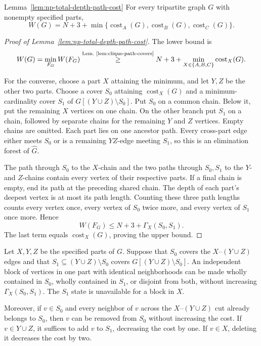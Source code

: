 \begin{restatedlemma}{Lemma~\ref{lem:np-total-depth-path-cost}}
For every tripartite graph $G$ with nonempty specified parts,
\[
 W(G)=N+3+\min\{\operatorname{cost}_A(G),
                 \operatorname{cost}_B(G),
                 \operatorname{cost}_C(G)\}.
\]
\end{restatedlemma}

\begin{proof}[Proof of Lemma~\ref{lem:np-total-depth-path-cost}]
The lower bound is
\[
 W(G)=\min_{F_G}W(F_G)
 \overset{\text{Lem.~\ref{lem:clique-path-covers}}}{\ge}
 N+3+\min_{X\in\{A,B,C\}}\operatorname{cost}_X(G).
\]

For the converse, choose a part $X$ attaining the minimum, and let
$Y,Z$ be the other two parts. Choose a cover $S_0$ attaining
$\operatorname{cost}_X(G)$ and a minimum-cardinality cover $S_1$
of $G[(Y\cup Z)\setminus S_0]$. Put $S_0$ on a common chain.
Below it, put the remaining $X$ vertices on one chain. On the other
branch put $S_1$ on a chain, followed by separate chains for the
remaining $Y$ and $Z$ vertices. Empty chains are omitted. Each part
lies on one ancestor path. Every cross-part edge either meets
$S_0$ or is a remaining $YZ$-edge meeting $S_1$, so this is an
elimination forest of $\widehat G$.

The path through $S_0$ to the $X$-chain and the two paths through
$S_0,S_1$ to the $Y$- and $Z$-chains contain every vertex of their
respective parts. If a final chain is empty, end its path at the
preceding shared chain. The depth of each part's deepest vertex is
at most its path length. Counting these three path lengths counts
every vertex once, every vertex of $S_0$ twice more, and every
vertex of $S_1$ once more. Hence
\[
 W(F_G)\le N+3+\Gamma_X(S_0,S_1).
\]
The last term equals $\operatorname{cost}_X(G)$, proving the upper bound.
\end{proof}

\begin{lemma}
\label{lem:total-depth-cover-normalization}
Let $X,Y,Z$ be the specified parts of $G$. Suppose that $S_0$ covers
the $X$--$(Y\cup Z)$ edges and that
$S_1\subseteq(Y\cup Z)\setminus S_0$ covers
$G[(Y\cup Z)\setminus S_0]$. An independent block of vertices in
one part with identical neighborhoods can be made wholly contained
in $S_0$, wholly contained in $S_1$, or disjoint from both, without
increasing $\Gamma_X(S_0,S_1)$. The $S_1$ state is unavailable
for a block in $X$.

Moreover, if $v\in S_0$ and every neighbor of $v$ across the
$X$--$(Y\cup Z)$ cut already belongs to $S_0$, then $v$ can be
removed from $S_0$ without increasing the cost. If $v\in Y\cup Z$,
it suffices to add $v$ to $S_1$, decreasing the cost by one.
If $v\in X$, deleting it decreases the cost by two.
\end{lemma}


